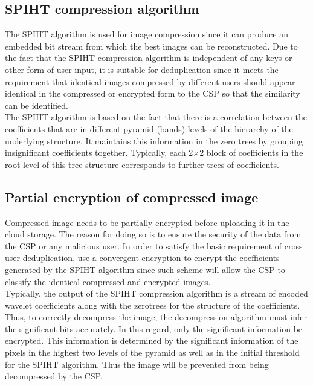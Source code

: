 \documentclass[10pt,a4paper,journal]{IEEEtran}
\begin{document}
\subsection{SPIHT compression algorithm}
\hspace*{2em} The SPIHT algorithm  is used for image compression since it can produce an embedded bit stream from which the best images can be reconstructed. Due to the fact that the SPIHT compression algorithm
is independent of any keys or other form of user input, it is suitable for deduplication \cite{9} since it meets the requirement
that identical images compressed by different users should appear identical in the compressed or encrypted form to the CSP so that the similarity can be identified.\\
\hspace*{2em} The SPIHT algorithm is based on the fact that there is a correlation
between the coefficients that are in different pyramid (bands) levels of the hierarchy of the underlying structure. It maintains this information in the zero trees by grouping insignificant
coefficients together. Typically, each 2$\times$2 block of
coefficients in the root level of this tree structure corresponds to further trees of coefficients. 

\subsection{Partial encryption of compressed image}
\hspace*{2em} Compressed image needs to be partially encrypted\cite{10} before uploading it
in the cloud storage. The reason for doing so is to ensure the
security of the data from the CSP or any malicious user. In order to satisfy the basic requirement of cross
user deduplication,  use a convergent encryption to encrypt the coefficients generated by the SPIHT\cite{11} algorithm since such scheme will allow the CSP to classify the identical compressed and encrypted images.\\
\hspace*{2em} Typically, the output of the SPIHT compression algorithm is a stream of encoded wavelet coefficients along with the
zerotrees for the structure of the coefficients. Thus, to correctly decompress the
image, the decompression algorithm must infer the significant
bits accurately. In this regard, only the significant information be encrypted.
This information is determined by the significant information of the pixels in the highest two levels of the pyramid as well as in the initial threshold for the SPIHT algorithm.
 Thus the image will be prevented from being decompressed by the CSP. \\
 
\end{document}
